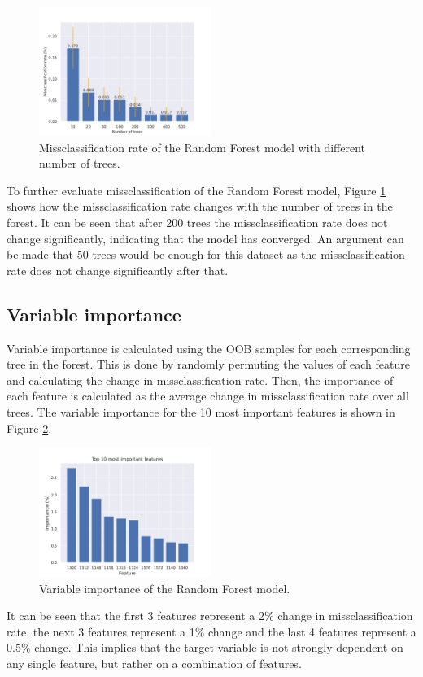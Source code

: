 \documentclass[fleqn,moreauthors,10pt]{ds_report}
\begin{document}
\begin{figure}[!ht]
	\centering
	\includegraphics[width=0.5\textwidth]{missclassification.pdf}
	\caption{Missclassification rate of the Random Forest model with different number of trees.}
	\label{fig:missN}
\end{figure}
To further evaluate missclassification of the Random Forest model, Figure \ref{fig:missN} shows how the missclassification rate changes with the number of trees in the forest.
It can be seen that after 200 trees the missclassification rate does not change significantly, indicating that the model has converged.
An argument can be made that 50 trees would be enough for this dataset as the missclassification rate does not change significantly after that.

\subsection*{Variable importance}
Variable importance is calculated using the OOB samples for each corresponding tree in the forest.
This is done by randomly permuting the values of each feature and calculating the change in missclassification rate.
Then, the importance of each feature is calculated as the average change in missclassification rate over all trees.
The variable importance for the 10 most important features is shown in Figure \ref{fig:importance}.
\begin{figure}[!ht]
	\centering
	\includegraphics[width=0.5\textwidth]{importance.pdf}
	\caption{Variable importance of the Random Forest model.}
	\label{fig:importance}
\end{figure}
It can be seen that the first 3 features represent a 2\% change in missclassification rate, the next 3 features represent a 1\% change and the last 4 features represent a 0.5\% change.
This implies that the target variable is not strongly dependent on any single feature, but rather on a combination of features.
\end{document}
